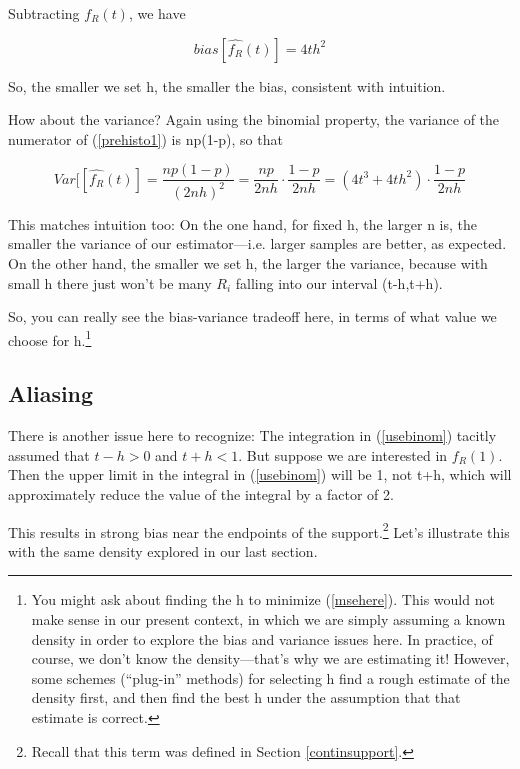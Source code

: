Subtracting $f_R(t)$, we have

\begin{equation}
\label{biasex}
bias[\widehat{f_R}(t)] = 4th^2
\end{equation}

So, the smaller we set h, the smaller the bias, consistent with
intuition.

How about the variance?  Again using the binomial property, the variance
of the numerator of (\ref{prehisto1}) is np(1-p), so that 

\begin{equation}
Var[[\widehat{f_R}(t)] = 
\frac{np(1-p)}{(2nh)^2} =
\frac{np}{2nh} \cdot \frac{1-p}{2nh} =
(4t^3+4th^2) \cdot \frac{1-p}{2nh} 
\end{equation}

This matches intuition too:  On the one hand, for fixed h, the larger n
is, the smaller the variance of our estimator---i.e. larger samples are
better, as expected.  On the other hand, the smaller we set h, the
larger the variance, because with small h there just won't be many $R_i$
falling into our interval (t-h,t+h).

So, you can really see the bias-variance tradeoff here, in terms of what
value we choose for h.\footnote{You might ask about finding the h to
minimize (\ref{msehere}).  This would not make sense in our present
context, in which we are simply assuming a known density in order to
explore the bias and variance issues here.  In practice, of course, we
don't know the density---that's why we are estimating it!  However,
some schemes (``plug-in'' methods) for selecting h find a rough estimate
of the density first, and then find the best h under the assumption that
that estimate is correct.}

\subsection{Aliasing}

There is another issue here to recognize:  The integration in
(\ref{usebinom}) tacitly assumed that $t-h > 0$ and $t+h < 1$.  But
suppose we are interested in $f_R(1)$.  Then the upper limit in the
integral in (\ref{usebinom}) will be 1, not t+h, which will
approximately reduce the value of the integral by a factor of 2.

This results in strong bias near the endpoints of the
support.\footnote{Recall that this term was defined in Section
\ref{continsupport}.}  Let's illustrate this with the same density
explored in our last section.

